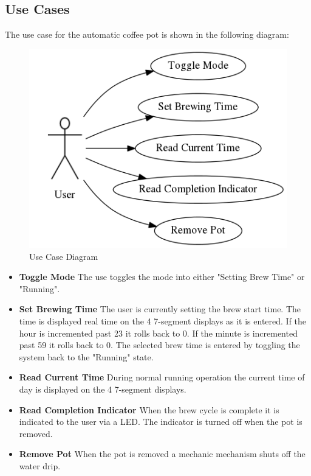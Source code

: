 \documentclass[12pt]{article}
\begin{document}
\subsection{Use Cases}
The use case for the automatic coffee pot is shown in the following diagram:
\begin{figure}
\centering
\includegraphics[scale=0.7]{use_case.png}
\caption{Use Case Diagram}
\label{fig:use_case}
\end{figure}
\begin{itemize}
    \item \textbf{Toggle Mode} The use toggles the mode into either "Setting Brew Time" or "Running".
    \item \textbf{Set Brewing Time} The user is currently setting the brew start time. The time is displayed real time on the 4 7-segment displays as it is entered. If the hour is incremented past 23 it rolls back to 0. If the minute is incremented past 59 it rolls back to 0. The selected brew time is entered by toggling the system back to the "Running" state.
    \item \textbf{Read Current Time} During normal running operation the current time of day is displayed on the 4 7-segment displays.
    \item \textbf{Read Completion Indicator} When the brew cycle is complete it is indicated to the user via a LED. The indicator is turned off when the pot is removed.
    \item \textbf{Remove Pot} When the pot is removed a mechanic mechanism shuts off the water drip.
\end{itemize}
\end{document}
